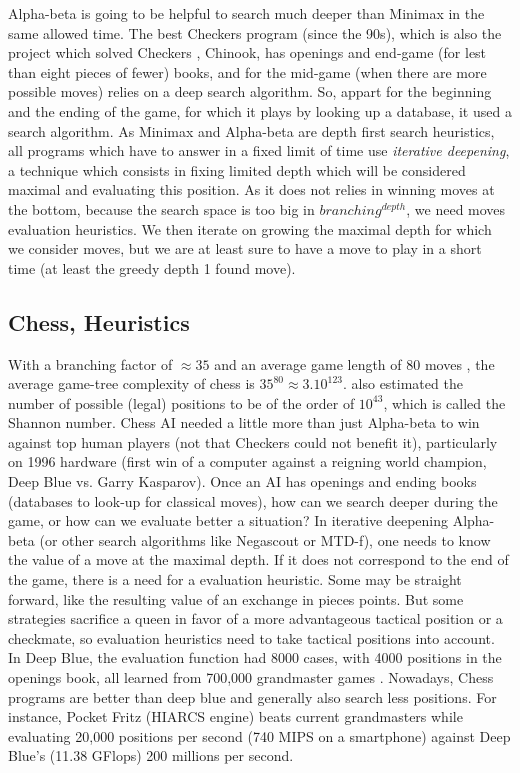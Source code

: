 Alpha-beta is going to be helpful to search much deeper than Minimax in the same allowed time. The best Checkers program (since the 90s), which is also the project which solved Checkers \citep{SchaefferBBKMLLS07}, Chinook, has openings and end-game (for lest than eight pieces of fewer) books, and for the mid-game (when there are more possible moves) relies on a deep search algorithm. So, appart for the beginning and the ending of the game, for which it plays by looking up a database, it used a search algorithm. As Minimax and Alpha-beta are depth first search heuristics, all programs which have to answer in a fixed limit of time use \textit{iterative deepening}, a technique which consists in fixing limited depth which will be considered maximal and evaluating this position. As it does not relies in winning moves at the bottom, because the search space is too big in $branching^{depth}$, we need moves evaluation heuristics. We then iterate on growing the maximal depth for which we consider moves, but we are at least sure to have a move to play in a short time (at least the greedy depth 1 found move).

\subsection{Chess, Heuristics}
With a branching factor of $\approx 35$ and an average game length of 80 moves \citep{Shannon_1950}, the average game-tree complexity of chess is $35^{80}\approx 3.10^{123}$. \citet{Shannon_1950} also estimated the number of possible (legal) positions to be of the order of $10^{43}$, which is called the Shannon number. Chess AI needed a little more than just Alpha-beta to win against top human players (not that Checkers could not benefit it), particularly on 1996 hardware (first win of a computer against a reigning world champion, Deep Blue vs. Garry Kasparov). Once an AI has openings and ending books (databases to look-up for classical moves), how can we search deeper during the game, or how can we evaluate better a situation? In iterative deepening Alpha-beta (or other search algorithms like Negascout \citep{reinfeld1983negascout} or MTD-f\citep{Plaat1996}), one needs to know the value of a move at the maximal depth. If it does not correspond to the end of the game, there is a need for a evaluation heuristic. Some may be straight forward, like the resulting value of an exchange in pieces points. But some strategies sacrifice a queen in favor of a more advantageous tactical position or a checkmate, so evaluation heuristics need to take tactical positions into account. In Deep Blue, the evaluation function had 8000 cases, with 4000 positions in the openings book, all learned from 700,000 grandmaster games \citep{DeepBlue}. Nowadays, Chess programs are better than deep blue and generally also search less positions. For instance, Pocket Fritz (HIARCS engine) beats current grandmasters \citep{PocketFritz,CopaMercosur} while evaluating 20,000 positions per second (740 MIPS on a smartphone) against Deep Blue's (11.38 GFlops) 200 millions per second.

